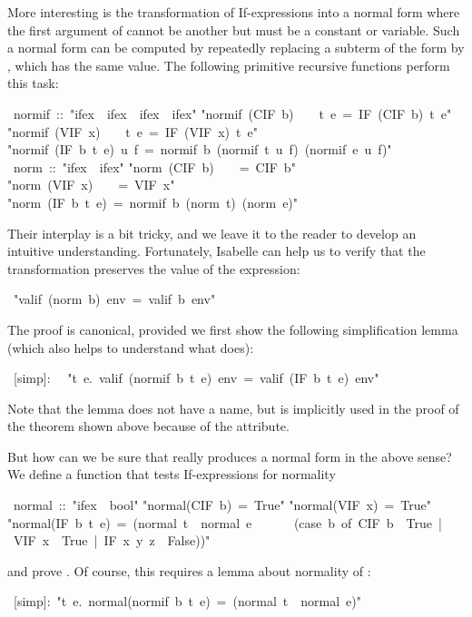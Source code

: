 \begin{isabelle}
\begin{isamarkuptext}
More interesting is the transformation of If-expressions into a normal form
where the first argument of  cannot be another  but
must be a constant or variable. Such a normal form can be computed by
repeatedly replacing a subterm of the form  by
, which has the same value. The following
primitive recursive functions perform this task:%
\end{isamarkuptext}%
~normif~::~{"}ifex~{\isasymRightarrow}~ifex~{\isasymRightarrow}~ifex~{\isasymRightarrow}~ifex{"}\isanewline
{}\isanewline
{"}normif~(CIF~b)~~~~t~e~=~IF~(CIF~b)~t~e{"}\isanewline
{"}normif~(VIF~x)~~~~t~e~=~IF~(VIF~x)~t~e{"}\isanewline
{"}normif~(IF~b~t~e)~u~f~=~normif~b~(normif~t~u~f)~(normif~e~u~f){"}\isanewline
\isanewline
{}~norm~::~{"}ifex~{\isasymRightarrow}~ifex{"}\isanewline
{}\isanewline
{"}norm~(CIF~b)~~~~=~CIF~b{"}\isanewline
{"}norm~(VIF~x)~~~~=~VIF~x{"}\isanewline
{"}norm~(IF~b~t~e)~=~normif~b~(norm~t)~(norm~e){"}%
\begin{isamarkuptext}%
\noindent
Their interplay is a bit tricky, and we leave it to the reader to develop an
intuitive understanding. Fortunately, Isabelle can help us to verify that the
transformation preserves the value of the expression:%
\end{isamarkuptext}%
~{"}valif~(norm~b)~env~=~valif~b~env{"}%
\begin{isamarkuptext}%
\noindent
The proof is canonical, provided we first show the following simplification
lemma (which also helps to understand what  does):%
\end{isamarkuptext}%
~[simp]:\isanewline
~~{"}{\isasymforall}t~e.~valif~(normif~b~t~e)~env~=~valif~(IF~b~t~e)~env{"}%
\begin{isamarkuptext}%
\noindent
Note that the lemma does not have a name, but is implicitly used in the proof
of the theorem shown above because of the \isa{[simp]} attribute.

But how can we be sure that  really produces a normal form in
the above sense? We define a function that tests If-expressions for normality%
\end{isamarkuptext}%
~normal~::~{"}ifex~{\isasymRightarrow}~bool{"}\isanewline
{}\isanewline
{"}normal(CIF~b)~=~True{"}\isanewline
{"}normal(VIF~x)~=~True{"}\isanewline
{"}normal(IF~b~t~e)~=~(normal~t~{\isasymand}~normal~e~{\isasymand}\isanewline
~~~~~(case~b~of~CIF~b~{\isasymRightarrow}~True~|~VIF~x~{\isasymRightarrow}~True~|~IF~x~y~z~{\isasymRightarrow}~False)){"}%
\begin{isamarkuptext}%
\noindent
and prove . Of course, this requires a lemma about
normality of :%
\end{isamarkuptext}%
~[simp]:~{"}{\isasymforall}t~e.~normal(normif~b~t~e)~=~(normal~t~{\isasymand}~normal~e){"}\end{isabelle}%
